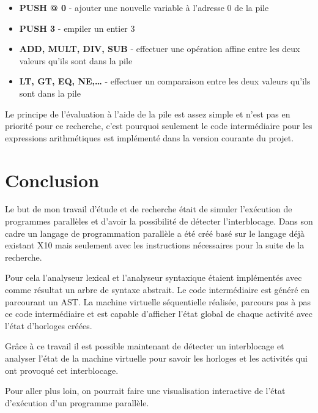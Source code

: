 \documentclass[12pt]{scrartcl}
\begin{document}
\begin{itemize} 
  \item \textbf{PUSH @ 0} - ajouter une nouvelle variable à l'adresse 0 de la pile
  \item \textbf{PUSH 3} - empiler un entier 3
  \item \textbf{ADD, MULT, DIV, SUB} - effectuer une opération affine entre les deux valeurs qu'ils sont dans la pile
  \item \textbf{LT, GT, EQ, NE,\dots} - effectuer un comparaison entre les deux valeurs qu'ils sont dans la pile
\end{itemize} 


Le principe de l'évaluation à l'aide de la pile est assez simple et n'est pas en priorité pour ce recherche, c'est pourquoi 
seulement le code intermédiaire pour les expressions arithmétiques est implémenté dans la version courante du projet.



\section{Conclusion}
Le but de mon travail d'étude et de recherche était de simuler l'exécution de programmes parallèles et d'avoir la possibilité
de détecter l'interblocage. Dans son cadre un langage de programmation parallèle a été créé basé sur le langage déjà existant X10
mais seulement avec les instructions nécessaires pour la suite de la recherche. 

Pour cela l'analyseur lexical et l'analyseur syntaxique étaient implémentés avec comme résultat un arbre de syntaxe abstrait. 
Le code intermédiaire est généré en parcourant un AST. La machine virtuelle séquentielle réalisée, parcours pas à pas ce code intermédiaire
et est capable d'afficher l'état global de chaque activité avec l'état d'horloges créées.

Grâce à ce travail il est possible maintenant de détecter un interblocage et analyser l'état de la machine virtuelle pour savoir les horloges et les activités 
qui ont provoqué cet interblocage.

Pour aller plus loin, on pourrait faire une visualisation interactive de l'état d'exécution d'un programme parallèle.
\end{document}
